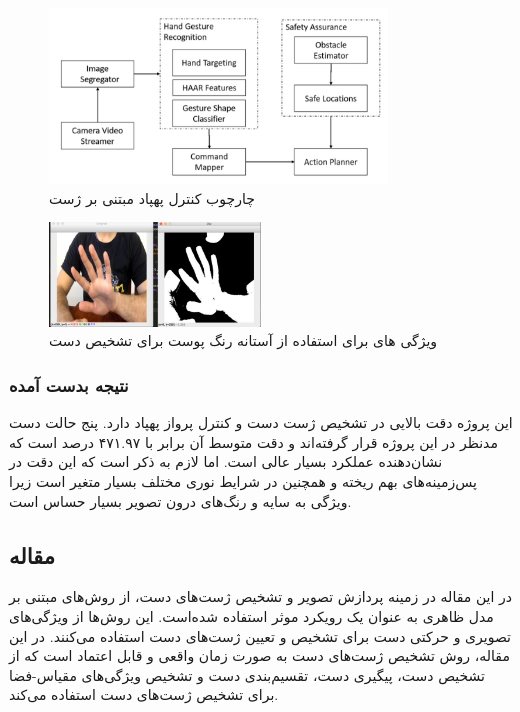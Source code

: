 \begin{figure}[h]
    \centering
    \includegraphics[width=0.8\textwidth]{Haar2.png}
    \caption{چارچوب کنترل پهپاد مبتنی بر ژست}
\end{figure}


\begin{figure}[h]
    \centering
    \includegraphics[width=0.5\textwidth]{Haar3.png}
    \caption{ ویژگی های  برای استفاده از آستانه رنگ پوست برای تشخیص دست}
\end{figure}




\subsubsection{نتیجه بدست آمده}
این پروژه دقت بالایی در تشخیص ژست دست و کنترل پرواز پهپاد دارد. پنج حالت دست مدنظر در این پروژه قرار گرفته‌اند و دقت متوسط آن برابر با ۴۷۱.۹۷ درصد 
است که نشان‌دهنده عملکرد بسیار عالی است. اما لازم به ذکر است که این دقت در پس‌زمینه‌های بهم ریخته و همچنین در شرایط نوری مختلف 
بسیار متغیر است زیرا ویژگی  به سایه و رنگ‌های درون تصویر بسیار حساس است.



\subsection{مقاله }
در این مقاله در زمینه پردازش تصویر و تشخیص ژست‌های دست، از روش‌های مبتنی بر مدل ظاهری  به عنوان یک رویکرد موثر استفاده شده‌‌است.
این روش‌ها از ویژگی‌های تصویری و حرکتی دست برای تشخیص و تعیین ژست‌های دست استفاده می‌کنند. در این مقاله، روش تشخیص ژست‌های دست به صورت زمان واقعی و 
قابل اعتماد است که از تشخیص دست، پیگیری دست، تقسیم‌بندی دست و تشخیص ویژگی‌های مقیاس-فضا برای تشخیص ژست‌های دست استفاده می‌کند.

